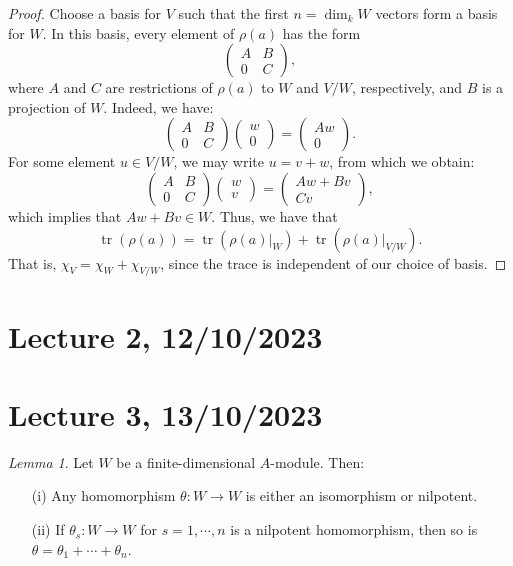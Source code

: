 \documentclass[a4paper]{report}
\theoremstyle{definition}
\theoremstyle{remark}
\theoremstyle{proposition}
\theoremstyle{conjecture}
\theoremstyle{lemma}
\newtheorem{lemma}{Lemma}
\theoremstyle{corollary}
\theoremstyle{exercise}
\theoremstyle{example}
\newcommand{\on}{\operatorname}
\begin{document}
\begin{proof}
    Choose a basis for $V$ such that the first $n = \dim_kW$ vectors 
    form a basis for $W$. In this basis, every element of $\rho(a)$
    has the form 
    $$\begin{pmatrix} 
        A&B\\
        0&C
    \end{pmatrix},$$
    where $A$ and $C$ are restrictions of $\rho(a)$ to $W$ and $V/W$, 
    respectively, and $B$ is a projection of $W$. 
    Indeed, we have:
    $$\begin{pmatrix}
        A & B\\
        0 & C
        \end{pmatrix} \begin{pmatrix}
        w\\
        0
        \end{pmatrix} = \begin{pmatrix}
        Aw\\
        0
    \end{pmatrix}.$$
    For some element $u \in V/W$, we may write $u = v+w$, from which
    we obtain:
    $$\begin{pmatrix}
        A & B\\
        0 & C
    \end{pmatrix} \begin{pmatrix}
    w\\
    v
        \end{pmatrix} = \begin{pmatrix}
        Aw + Bv\\
        Cv
    \end{pmatrix},$$
    which implies that $Aw + Bv \in W$. Thus, we have that 
    $$\on{tr}(\rho(a)) = \on{tr}(\rho(a)\vert_W) + \on{tr}(\rho(a)\vert_{V/W}).$$
    That is, $\chi_V = \chi_W + \chi_{V/W}$, since the trace is independent 
    of our choice of basis.
\end{proof}

\section{Lecture 2, 12/10/2023}

\section{Lecture 3, 13/10/2023}

\begin{lemma}\label{lem15}
    Let $W$ be a finite-dimensional $A$-module. Then:
    \begin{itemize}
        \item[(i)] Any homomorphism $\theta : W\to W$ is either an isomorphism
            or nilpotent.
        \item[(ii)] If $\theta_s : W\to W$ for $s=1,\cdots,n$ is a nilpotent
            homomorphism, then so is $\theta=\theta_1+\cdots+\theta_n$.
    \end{itemize}
\end{lemma}
\end{document}
